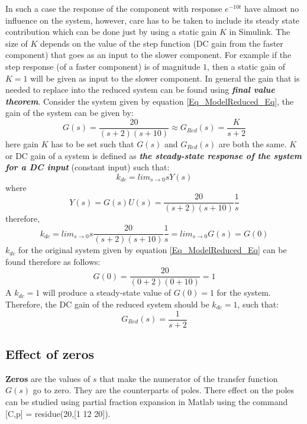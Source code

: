 In such a case the response of the component with response $e^{-10t}$ have almost no influence on the system, however, care has to be taken to include its steady state contribution which can be done just by using a static gain $K$ in Simulink. The size of $K$ depends on the value of the step function (DC gain from the faster component) that goes as an input to the slower component. For example if the step response (of a faster component) is of magnitude $1$, then a static gain of $K = 1$ will be given as input to the slower component. In general the gain that is needed to replace into the reduced system can be found using \textbf{\textit{final value theorem}}. Consider the system given by equation \eqref{Eq_ModelReduced_Eq}, the gain of the system can be given by:
\begin{equation}
	G(s) = \frac{20}{(s+2)(s+10)} \approx G_{Red}(s) = \frac{K}{s+2}
\end{equation}
here gain $K$ has to be set such that $G(s)$ and $G_{Red}(s)$ are both the same. $K$ or DC gain of a system is defined as \textbf{\textit{the steady-state response of the system for a DC input}} (constant input) such that:
\begin{equation}
	k_{dc} = lim_{s \rightarrow 0} s Y(s)
\end{equation}
where $$Y(s) = G(s)U(s) = \frac{20}{(s+2)(s+10)} \frac{1}{s}$$
therefore,
$$ k_{dc} = lim_{s \rightarrow 0} s \frac{20}{(s+2)(s+10)} \frac{1}{s} = lim_{s \rightarrow 0} G(s) = G(0) $$
$k_{dc}$ for the original system given by equation \eqref{Eq_ModelReduced_Eq} can be found therefore as follows:
\begin{equation}
	G(0) = \frac{20}{(0+2)(0+10)} = 1
\end{equation}
A $k_{dc} = 1$ will produce a steady-state value of $G(0) = 1$ for the system. Therefore, the DC gain of the reduced system should be $k_{dc} = 1$, such that:
\begin{equation}
	G_{Red}(s) = \frac{1}{s+2}
\end{equation}

\subsection{Effect of zeros}

\textbf{Zeros} are the values of $s$ that make the numerator of the transfer function $G(s)$ go to zero. They are the counterparts of poles. There effect on the poles can be studied using partial fraction expansion in Matlab using the command \textcolor{mygray}{[C,p] = residue(20,[1 12 20])}. 

